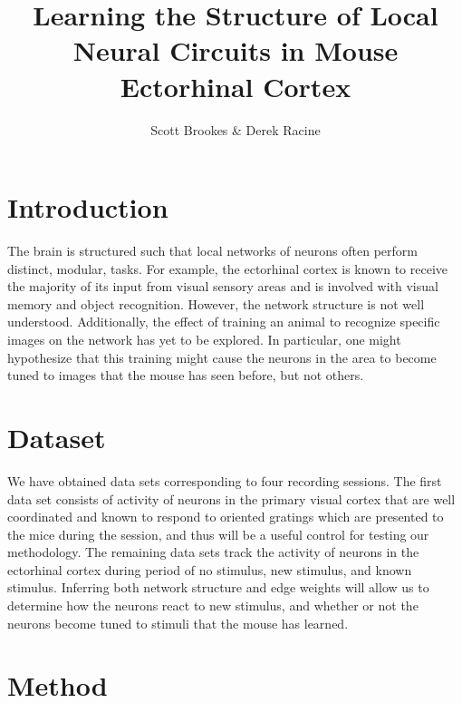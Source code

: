 \documentclass{article}
\begin{document}
\title{Learning the Structure of Local Neural Circuits in Mouse Ectorhinal Cortex}
\author{Scott Brookes \& Derek Racine}

\maketitle

\section*{Introduction}
The brain is structured such that local networks of neurons often perform 
distinct, modular, tasks. For example, the ectorhinal cortex is known to 
receive the majority of its input from visual sensory areas and is involved 
with visual memory and object recognition. However, the network structure is 
not well understood. Additionally, the effect of training an animal to 
recognize specific images on the network has yet to be explored. In particular,
one might hypothesize that this training might cause the neurons in the area to
become tuned to images that the mouse has seen before, but not others. \par

\section*{Dataset}

We have obtained data sets corresponding to four recording sessions. The first 
data set consists of activity of neurons in the primary visual cortex that are 
well coordinated and known to respond to oriented gratings which are presented 
to the mice during the session, and thus will be a useful control for testing 
our methodology. The remaining data sets track the activity of neurons in the 
ectorhinal cortex during period of no stimulus, new stimulus, and known 
stimulus. Inferring both network structure and edge weights will allow us to 
determine how the neurons react to new stimulus, and whether or not the 
neurons become tuned to stimuli that the mouse has learned. \par

\section*{Method}
\end{document}
